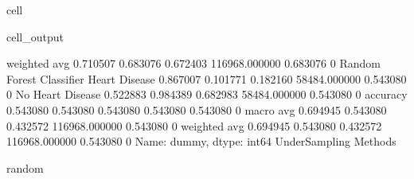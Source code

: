 \documentclass[letterpaper,10pt,english]{jupyterBook}
\begin{document}
\begin{sphinxuseclass}{cell}
\begin{sphinxVerbatimOutput}
\begin{sphinxuseclass}{cell_output}
\begin{sphinxVerbatim}[commandchars=\\\{\}]
                           weighted avg      0.710507   0.683076  0.672403  116968.000000  0.683076    0
Random Forest Classifier   Heart Disease     0.867007   0.101771  0.182160  58484.000000   0.543080    0
                           No Heart Disease  0.522883   0.984389  0.682983  58484.000000   0.543080    0
                           accuracy          0.543080   0.543080  0.543080  0.543080       0.543080    0
                           macro avg         0.694945   0.543080  0.432572  116968.000000  0.543080    0
                           weighted avg      0.694945   0.543080  0.432572  116968.000000  0.543080    0
Name: dummy, dtype: int64
UnderSampling Methods
\PYGZhy{}\PYGZhy{}\PYGZhy{}\PYGZhy{}\PYGZhy{}\PYGZhy{}\PYGZhy{}\PYGZhy{}\PYGZhy{}\PYGZhy{}\PYGZhy{}\PYGZhy{}\PYGZhy{}\PYGZhy{}\PYGZhy{}\PYGZhy{}\PYGZhy{}\PYGZhy{}\PYGZhy{}

random
\PYGZhy{}\PYGZhy{}\PYGZhy{}\PYGZhy{}\PYGZhy{}\PYGZhy{}\PYGZhy{}\PYGZhy{}\PYGZhy{}\PYGZhy{}\PYGZhy{}\PYGZhy{}\PYGZhy{}\PYGZhy{}\PYGZhy{}\PYGZhy{}\PYGZhy{}\PYGZhy{}\PYGZhy{}
\end{sphinxVerbatim}

\noindent{}


\end{sphinxuseclass}
\end{sphinxVerbatimOutput}
\end{sphinxuseclass}
\end{document}
